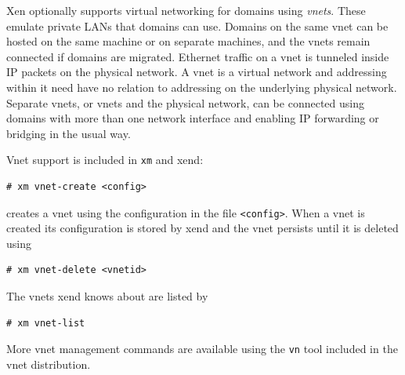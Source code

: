 \documentclass[11pt,twoside,final,openright]{report}
\def\xend{{xend}\xspace}
\begin{document}
Xen optionally supports virtual networking for domains using {\em vnets}.
These emulate private LANs that domains can use. Domains on the same
vnet can be hosted on the same machine or on separate machines, and the
vnets remain connected if domains are migrated. Ethernet traffic 
on a vnet is tunneled inside IP packets on the physical network. A vnet is a virtual
network and addressing within it need have no relation to addressing on 
the underlying physical network. Separate vnets, or vnets and the physical network,
can be connected using domains with more than one network interface and
enabling IP forwarding or bridging in the usual way.

Vnet support is included in \texttt{xm} and \xend:
\begin{verbatim}
# xm vnet-create <config>
\end{verbatim}
creates a vnet using the configuration in the file \verb|<config>|.
When a vnet is created its configuration is stored by \xend and the vnet persists until it is
deleted using
\begin{verbatim}
# xm vnet-delete <vnetid>
\end{verbatim}
The vnets \xend knows about are listed by
\begin{verbatim}
# xm vnet-list
\end{verbatim}
More vnet management commands are available using the
\texttt{vn} tool included in the vnet distribution.
\end{document}
